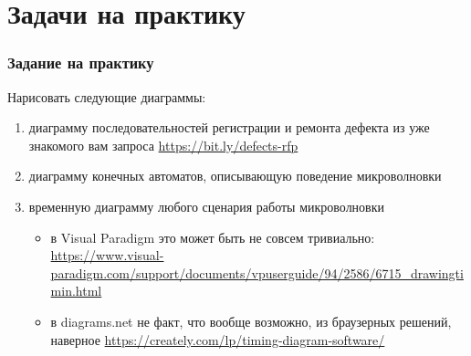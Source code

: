 \documentclass{../../slides-style}
\begin{document}
    \begin{frame}[plain]
        \titlepage
    \end{frame}

    \section{Задачи на практику}

    \begin{frame}
        \frametitle{Задание на практику}
        Нарисовать следующие диаграммы:
        \begin{enumerate}
            \item диаграмму последовательностей регистрации и ремонта дефекта из уже знакомого вам запроса \url{https://bit.ly/defects-rfp}
            \item диаграмму конечных автоматов, описывающую поведение микроволновки
            \item временную диаграмму любого сценария работы микроволновки
            \begin{itemize}
                \item в Visual Paradigm это может быть не совсем тривиально: \url{https://www.visual-paradigm.com/support/documents/vpuserguide/94/2586/6715_drawingtimin.html}
                \item в diagrams.net не факт, что вообще возможно, из браузерных решений, наверное \url{https://creately.com/lp/timing-diagram-software/}
            \end{itemize}
        \end{enumerate}
    \end{frame}
\end{document}
